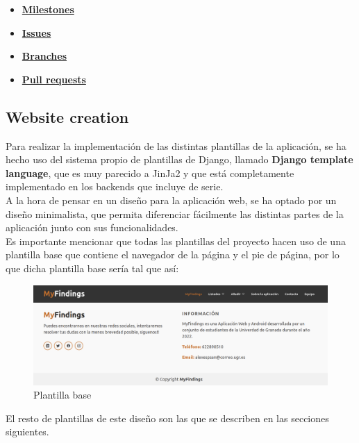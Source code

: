 \begin{itemize}
    \item \textbf{\href{https://github.com/alexespana/TFG/milestones}{Milestones}}
    \item \textbf{\href{https://github.com/alexespana/TFG/issues}{Issues}}
    \item \textbf{\href{https://github.com/alexespana/TFG/branches}{Branches}}
    \item \textbf{\href{https://github.com/alexespana/TFG/pulls}{Pull requests}}
\end{itemize}


\subsection{Website creation}
Para realizar la implementación de las distintas plantillas de la aplicación, se ha hecho
uso del sistema propio de plantillas de Django, llamado \textbf{Django template language},
que es muy parecido a JinJa2 y que está completamente implementado en los backends que
incluye de serie.\\

A la hora de pensar en un diseño para la aplicación web, se ha optado por un diseño
minimalista, que permita diferenciar fácilmente las distintas partes de la aplicación
junto con sus funcionalidades.\\

Es importante mencionar que todas las plantillas del proyecto hacen uso de una plantilla
base que contiene el navegador de la página y el pie de página, por lo que dicha plantilla base
sería tal que así:\\

    \begin{figure}[H]
        \centering
        \includegraphics[scale=0.25]{imagenes/base.png}
        \caption{Plantilla base}
        \label{fig:base}
    \end{figure}

El resto de plantillas de este diseño son las que se describen en las secciones siguientes.

